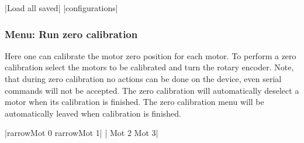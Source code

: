 |Load all saved|
|configurations|

\subsubsection{Menu: Run zero calibration}
\label{menu_zero_cal}
Here one can calibrate the motor zero position for each motor. To perform a zero calibration select the motors to be calibrated and turn the rotary encoder. Note, that during zero calibration no actions can be done on the device, even serial commands will not be accepted. The zero calibration will automatically deselect a motor when its calibration is finished. The zero calibration menu will be automatically leaved when calibration is finished.

|{rarrow}Mot 0  {rarrow}Mot 1|
| Mot 2   Mot 3|











\newpage
